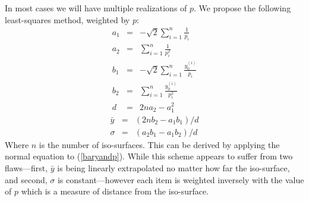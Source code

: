 In most cases we will have multiple realizations of $p$.  We propose the
following least-squares method, weighted by $p$:
\begin{eqnarray}
a_1 & = & - \sqrt 2 \sum_{i=1}^n \frac{1}{p_i} \\
a_2 & = & \sum_{i=1}^n \frac{1}{p_i^2} \\
b_1 & = & - \sqrt 2 \sum_{i=1}^n \frac{y_0^{(i)}}{p_i} \\
b_2 & = & \sum_{i=1}^n \frac{y_0^{(i)}}{p_i^2} \\
d & = & 2 n a_2 - a_1^2 
\end{eqnarray}
\begin{eqnarray}
\bar y & = & (2 n b_2 - a_1 b_1)/d \\
\sigma & = & (a_2 b_1 - a_1 b_2)/d
\end{eqnarray}
Where $n$ is the number of iso-surfaces.  This can be derived by applying the normal equation to (\ref{baryandp}).
While this scheme appears to suffer from two flaws---first, $\bar y$ is being
linearly extrapolated no matter how far the iso-surface, and second,
$\sigma$ is constant---however each item is weighted inversely with the 
value of $p$ which is a measure of distance from the iso-surface.

%

